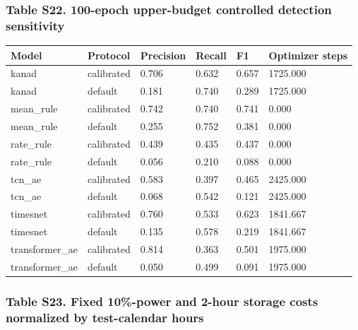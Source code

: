 \documentclass[a4paper,11pt]{article}
\newcounter{none}
\begin{document}
\subsubsection{Table S22. 100-epoch upper-budget controlled detection sensitivity}\label{table-s22.-100-epoch-upper-budget-controlled-detection-sensitivity}

{\def\LTcaptype{none} %
\begin{longtable}[]{@{}llllll@{}}
\toprule\noalign{}
Model & Protocol & Precision & Recall & F1 & Optimizer steps \\
\midrule\noalign{}
\endhead
\bottomrule\noalign{}
\endlastfoot
kanad & calibrated & 0.706 & 0.632 & 0.657 & 1725.000 \\
kanad & default & 0.181 & 0.740 & 0.289 & 1725.000 \\
mean\_rule & calibrated & 0.742 & 0.740 & 0.741 & 0.000 \\
mean\_rule & default & 0.255 & 0.752 & 0.381 & 0.000 \\
rate\_rule & calibrated & 0.439 & 0.435 & 0.437 & 0.000 \\
rate\_rule & default & 0.056 & 0.210 & 0.088 & 0.000 \\
tcn\_ae & calibrated & 0.583 & 0.397 & 0.465 & 2425.000 \\
tcn\_ae & default & 0.068 & 0.542 & 0.121 & 2425.000 \\
timesnet & calibrated & 0.760 & 0.533 & 0.623 & 1841.667 \\
timesnet & default & 0.135 & 0.578 & 0.219 & 1841.667 \\
transformer\_ae & calibrated & 0.814 & 0.363 & 0.501 & 1975.000 \\
transformer\_ae & default & 0.050 & 0.499 & 0.091 & 1975.000 \\
\end{longtable}
}

\subsubsection{Table S23. Fixed 10\%-power and 2-hour storage costs normalized by test-calendar hours}\label{table-s23.-fixed-10-power-and-2-hour-storage-costs-normalized-by-test-calendar-hours}
\end{document}
